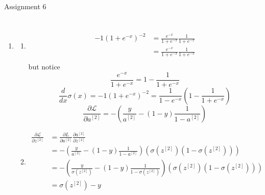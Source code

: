 \documentclass{report}
\begin{document}
\thispagestyle{empty}
\begin{center} \LARGE Assignment 6 \end{center}

\newcommand{\el}{\mathcal{L}}
\def\brac#1#2{#1^{[#2]}}


\section*{}
\begin{enumerate}
    \item [Q1]
    \begin{enumerate}
        \item \begin{equation}
            \begin{split}
                -1(1+e^{-x})^{-2} &= \frac{e^{-x}}{1+e^{-x}}\frac{1}{1+e^{-x}} \\
                &=\frac{e^{-x}}{1+e^{-x}}\frac{1}{1+e^{-x}} \\
            \end{split}
        \end{equation}
        but notice 
        \begin{equation}
            \frac{e^{-x}}{1+e^{-x}} = 1-\frac{1}{1+e^{-x}}
        \end{equation}
        \begin{equation}
            \frac{d}{dx} \sigma(x) = -1(1+e^{-x})^{-2} = \frac{1}{1-e^{-x}}\left( 1-\frac{1}{1+e^{-x}} \right)
        \end{equation}
        \begin{equation}
        \frac{\partial \mathcal{L}}{\partial a^{[2]}} = -\left( \frac{y}{a^{[2]}} - (1-y) \frac{1}{1-a^{[2]}} \right)
    \end{equation}
    \item \begin{equation}
        \begin{split}
            \frac{\partial \mathcal{L}}{\partial z^{[2]}} &= \frac{\partial L }{\partial a^{[2]}} \frac{\partial a^{[2]}}{\partial z^{[2]}}\\
            &= -\left( \frac{y}{a^{[2]}} - (1-y) \frac{1}{1-a^{[2]}} \right)\left( \sigma(z^{[2]})(1-\sigma(z^{[2]})) \right)\\
            &= -\left( \frac{y}{\sigma (z^{[2]})} - (1-y) \frac{1}{1-\sigma(z^{[2]})} \right)\left( \sigma(z^{[2]})(1-\sigma(z^{[2]})) \right)\\
            &= \sigma(z^{[2]}) - y \\

\end{split}
\end{equation}
\end{enumerate}
\end{enumerate}
\end{document}
